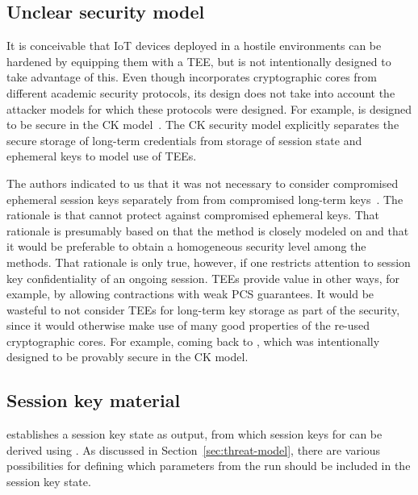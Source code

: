 \documentclass[runningheads, envcountsame, a4paper, draft, x11names]{llncs}
\newcommand{\spacehack}{\vspace{-1em}}
\newcommand{\fillhack}{\vspace{-0.5em}}
\begin{document}
\subsection{Unclear security model}
It is conceivable that IoT devices deployed in a hostile environments can be
hardened by equipping them with a TEE, but \mEdhoc{} is not intentionally
designed to take advantage of this.
%
Even though \mEdhoc{} incorporates cryptographic cores from different academic
security protocols, its design does not take into account the attacker models
for which these protocols were designed.
%
For example, \mOptls{} is designed to be secure in the CK
model~\cite{DBLP:conf/crypto/CanettiK02}.
%
The CK security model explicitly separates the secure storage of long-term
credentials from storage of session state and ephemeral keys to model
use of TEEs.
%

The \mEdhoc{} authors indicated to us that it was
not necessary to consider compromised ephemeral session keys separately from
from compromised long-term keys~\cite{personalCommunication}. 
%
The rationale is that \mSigma{} cannot protect against compromised ephemeral
keys.
%
That rationale is presumably based on that the \mSigSig{} method is
closely modeled on \mSigmaI{} and that it would be preferable to obtain a
homogeneous security level among the \mEdhoc{}
methods\cite{personalCommunication}.
%
That rationale is only true, however, if one restricts attention to session key
confidentiality of an ongoing session.
%
TEEs provide value in other ways, for example, by allowing contractions with 
weak PCS guarantees.
%
It would be wasteful to not consider TEEs for long-term key storage as part of
the security, since it would otherwise make use of many good properties of the
re-used cryptographic cores.
%
For example, coming back to \mOptls{}, which was intentionally
designed to be provably secure in the CK model.

\spacehack
\subsection{Session key material}
\label{sec:sessionKeyMaterial}
\fillhack
\mEdhoc{} establishes a session key state as output, from which session keys
for \mOscore{} can be derived using \mHkdf{}.
%
As discussed in Section~\ref{sec:threat-model}, there are various possibilities
for defining which parameters from the \mEdhoc{} run should be included in the
session key state.
%
\end{document}
